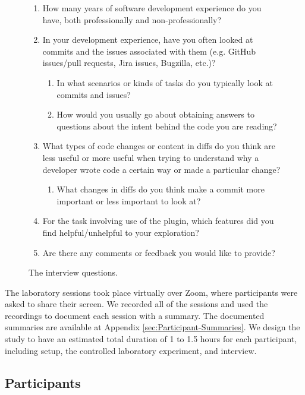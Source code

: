 \begin{figure}[h]
  \begin{mdframed}
    \begin{enumerate}
      \item How many years of software development experience do you have, both professionally and non-professionally?
      \item In your development experience, have you often looked at commits and the issues associated with them (e.g. GitHub issues/pull requests, Jira issues, Bugzilla, etc.)?
          \begin{enumerate}
              \item In what scenarios or kinds of tasks do you typically look at commits and issues?
              \item How would you usually go about obtaining answers to questions about the intent behind the code you are reading?
          \end{enumerate}
      \item What types of code changes or content in diffs do you think are less useful or more useful when trying to understand why a developer wrote code a certain way or made a particular change? 
          \begin{enumerate}
              \item What changes in diffs do you think make a commit more important or less important to look at?
          \end{enumerate}
      \item For the task involving use of the plugin, which features did you find helpful/unhelpful to your exploration?
      \item Are there any comments or feedback you would like to provide?
    \end{enumerate}
\end{mdframed}
  \caption{The interview questions.}
  \label{fig:Interview-Questions}
\end{figure}

The laboratory sessions took place virtually over Zoom, where participants were asked to share their screen.
We recorded all of the sessions and used the recordings to document each session with a summary.
The documented summaries are available at Appendix \ref{sec:Participant-Summaries}.
We design the study to have an estimated total duration of 1 to 1.5 hours for each participant,
including setup, the controlled laboratory experiment, and interview.

\subsection{Participants}

